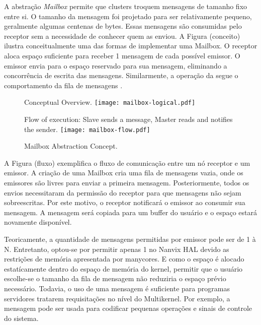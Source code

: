 			A abstração \textit{Mailbox} permite que clusters troquem mensagens
			de tamanho fixo entre si.
			O tamanho da mensagem foi projetado para ser relativamente pequeno,
			geralmente algumas centenas de bytes.
			Essas mensagens são consumidas pelo receptor sem a necessidade de conhecer quem as enviou.
			A Figura (conceito) ilustra conceitualmente uma das formas de implementar uma Mailbox.
			O receptor aloca espaço suficiente para receber 1 mensagem de cada possível emissor.
			O emissor envia para o espaço reservado para sua mensagem, eliminando a concorrência de escrita das mensagens.
			Similarmente, a operação da \mailbox segue o comportamento da fila de mensagens \posix.

			\begin{figure}[!tb]
				\centering%
				\caption{Mailbox Abstraction Concept.}%
				\label{fig:conpt_mailbox}%

					{Conceptual Overview.}%
					{\texttt{[image: mailbox-logical.pdf]}}%

				\hfill

					{Flow of execution: Slave sends a message, Master reads and notifies the sender.}%
					{\texttt{[image: mailbox-flow.pdf]}}%

			\end{figure}

			A Figura (fluxo) exemplifica o fluxo de comunicação entre um nó receptor e um emissor.
			A criação de uma Mailbox cria uma fila de mensagens vazia, onde os emissores são livres para enviar a primeira mensagem.
			Posteriormente, todos os envios necessitaram da permissão do receptor para que mensagens não sejam sobreescritas.
			Por este motivo, o receptor notificará o emissor ao consumir sua mensagem.
			A mensagem será copiada para um buffer do usuário e o espaço estará novamente disponível.

			Teoricamente, a quantidade de mensagens permitidas por emissor pode ser de 1 à N.
			Entretanto, optou-se por permitir apenas 1 no Nanvix HAL devido as restrições de memória apresentada por manycores.
			E como o espaço é alocado estatícamente dentro do espaço de memória do kernel, permitir que o usuário escolhe-se o tamanho da fila de mensagem não reduziria o espaço prévio necessário.
			Todavia, o uso de uma mensagem é suficiente para programas servidores tratarem requisitações no nível do Multikernel.
			Por exemplo, a mensagem pode ser usada para codificar pequenas operações e sinais de controle do sistema.

